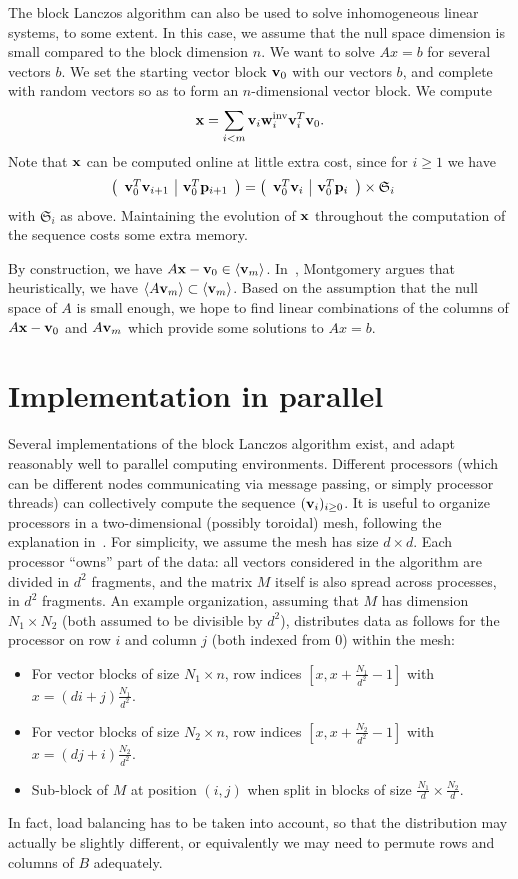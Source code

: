 The block Lanczos algorithm can also be used to solve
inhomogeneous linear systems, to some extent.
In this case, we assume that the null space dimension is small compared
to the block dimension $n$. We want to solve $Ax=b$ for several vectors $b$.
We set the starting vector block $\mathbf{v}_0$ with our vectors $b$, and
complete with random vectors so as to form an $n$-dimensional vector block. We compute
$$\mathbf{x}=\sum_{i<m}\mathbf{v}_i\mathbf{w}_i^{\text{inv}}\mathbf{v}_i^T\mathbf{v}_0.$$
Note that $\mathbf{x}$ can be computed online at little extra cost, since for
$i\geq1$ we have
\begin{align*}
\left(\begin{array}{c|c}\mathbf{v}_0^T\mathbf{v}_{i+1}&\mathbf{v}_0^T\mathbf{p}_{i+1}\end{array}\right) &=
    \left(\begin{array}{c|c}\mathbf{v}_0^T\mathbf{v}_{i}&\mathbf{v}_0^T\mathbf{p}_{i}\end{array}\right) \times\mathfrak{S}_i
\end{align*}
with $\mathfrak{S}_i$ as above.
Maintaining the evolution of $\mathbf{x}$ throughout the computation of the
sequence costs some extra memory.

By construction, we have $A\mathbf{x}-\mathbf{v}_0\in\langle\mathbf{v}_m\rangle$.
In~\cite{EC:Montgomery95}, Montgomery argues that heuristically, we have
$\langle A\mathbf{v}_m\rangle\subset\langle\mathbf{v}_m\rangle$. Based on the
assumption that the null space of $A$ is small enough, we hope to find
linear combinations of the columns of $A\mathbf{x}-\mathbf{v}_0$ and $A\mathbf{v}_m$ which
provide some solutions to $Ax=b$.


\section{Implementation in parallel}

Several implementations of the block Lanczos algorithm exist, and adapt
reasonably well to parallel computing environments. Different
processors (which can be different nodes communicating via message
passing, or simply processor threads) can collectively compute the
sequence $(\mathbf{v}_i)_{i\geq0}$.  It is useful to organize processors in a
two-dimensional (possibly toroidal) mesh, following the explanation in~\cite{Montgomery00}.
For simplicity, we assume the mesh has size $d\times d$.  Each processor
``owns'' part of the data: all vectors considered in the algorithm are
divided in $d^2$ fragments, and the matrix $M$ itself is also spread
across processes, in $d^2$ fragments.
An example organization, assuming that $M$ has dimension $N_1\times N_2$
(both assumed to be divisible by $d^2$), distributes data as follows for
the processor on row $i$ and column $j$ (both indexed from $0$) within the mesh:
\begin{itemize}
    \item For vector blocks of size $N_1\times n$, row indices $[x,x+\frac{N_1}{d^2}-1]$ with $x=(di+j)\frac{N_1}{d^2}$.
    \item For vector blocks of size $N_2\times n$, row indices $[x,x+\frac{N_2}{d^2}-1]$ with $x=(dj+i)\frac{N_2}{d^2}$.
    \item Sub-block of $M$ at position $(i,j)$ when split in blocks of
size $\frac{N_1}d\times\frac{N_2}d$.
\end{itemize}
In fact, load balancing has to be taken into account, so that the
distribution may actually be slightly different, or equivalently we may
need to permute rows and columns of $B$ adequately.

